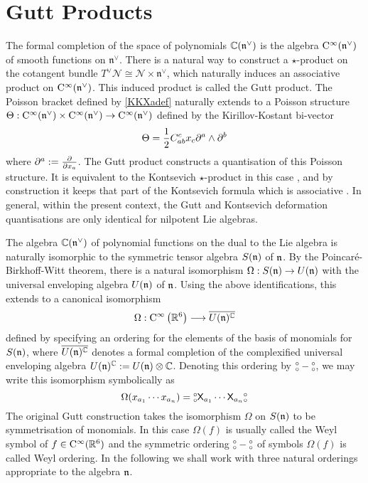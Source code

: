 \section{Gutt Products}
\label{StarProds}
The formal completion of the space of polynomials ${\mathbb C}({\mathfrak n}^\vee)$ is the algebra
${\rm C}^\infty(\mathfrak{n}^\vee)$ of smooth functions on $\mathfrak{n}^\vee$.
There is a natural way to construct a $\star$-product on the cotangent bundle
$T^\vee\mathcal{N}\cong\mathcal{N}\times\mathfrak{n}^\vee$, which naturally
induces an associative product on ${\rm C}^\infty({\mathfrak n}^\vee)$. This induced
product is called the Gutt product. The Poisson bracket defined by
\eqref{KKXadef} naturally extends to a Poisson structure
$\Theta:{\rm C}^\infty({\mathfrak n}^\vee)\times{\rm C}^\infty({\mathfrak n}^\vee)\to{\rm C}^\infty({\mathfrak n}^\vee)$
defined by the Kirillov-Kostant bi-vector
\begin{equation}
  \label{KKbivector}
  \Theta=\frac12C_{ab}^{  c} x_c \partial^a\wedge\partial^b
\end{equation}
where $\partial^a:=\frac{\partial}{\partial x_a}$. The Gutt product constructs a quantisation of
this Poisson structure. It is equivalent to the Kontsevich $\star$-product in
this case \cite{Dito1}, and by construction it keeps that part of the Kontsevich
formula which is associative \cite{Shoikhet1}. In general, within the present
context, the Gutt and Kontsevich deformation quantisations are only identical
for nilpotent Lie algebras.

The algebra ${\mathbb C}({\mathfrak n}^\vee)$ of polynomial functions on the dual to the Lie
algebra is naturally isomorphic to the symmetric tensor algebra $S({\mathfrak n})$ of
${\mathfrak n}$. By the Poincar\'e-Birkhoff-Witt theorem, there is a natural isomorphism
$\Omega:S({\mathfrak n})\to U({\mathfrak n})$ with the universal enveloping algebra $U({\mathfrak n})$ of
${\mathfrak n}$. Using the above identifications, this extends to a canonical isomorphism
\begin{equation}
  \label{Sigmaiso}
  \Omega : {\rm C}^\infty\left({\mathbb R}^6\right) \longrightarrow \overline{
    U({\mathfrak n})^{\mathbb C}}
\end{equation}
defined by specifying an ordering for the elements of the basis of monomials for
$S({\mathfrak n})$, where $\overline{U({\mathfrak n})^{\mathbb C}}$ denotes a formal completion of
the complexified universal enveloping algebra
$U(\mathfrak{n})^{\mathbb C}:=U(\mathfrak{n})\otimes{\mathbb C}$. Denoting this ordering
by $\mbox{$\substack{\circ\\\circ}$}-\mbox{$\substack{\circ\\\circ}$}$, we may write this isomorphism symbolically as
\begin{equation}
  \label{Sigmasymbol}
  \Omega(x_{a_1}\cdots x_{a_n})=\mbox{$\substack{\circ\\\circ}$} {\sf X}_{a_1}\cdots{\sf X}_{a_n} \mbox{$\substack{\circ\\\circ}$}
\end{equation}
The original Gutt construction \cite{Gutt1} takes the isomorphism $\Omega$ on
$S({\mathfrak n})$ to be symmetrisation of monomials. In this case $\Omega(f)$ is usually
called the Weyl symbol of $f\in{\rm C}^\infty({\mathbb R}^6)$ and the symmetric ordering
$\mbox{$\substack{\circ\\\circ}$}-\mbox{$\substack{\circ\\\circ}$}$ of symbols $\Omega(f)$ is called Weyl ordering. In the following we
shall work with three natural orderings appropriate to the algebra ${\mathfrak n}$.

